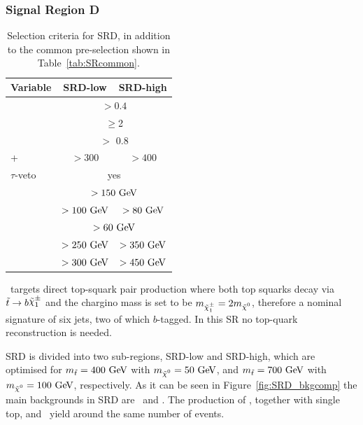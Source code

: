 			\subsubsection*{Signal Region D}

				\begin{table}
				  \caption{Selection criteria for SRD, in addition to the common pre-selection shown in Table~\ref{tab:SRcommon}.}
				  \begin{center}
				  \def\arraystretch{1.4}
				  \begin{tabular}{lcc}
				    \toprule
				    {\textbf{Variable}}       & {\textbf{SRD-low}} & {\textbf{SRD-high}} \\
				    \toprule
				    \dphijetthreemet     & \multicolumn{2}{c}{$>0.4$}     \\ %
				    \nBJet      & \multicolumn{2}{c}{$\geq$2}    \\%
				    \drbjetbjet     & \multicolumn{2}{c}{$>$ 0.8}    \\ %
				    \ptbzero+\ptbone & $>300$ \gev    & $>400$ \gev     \\ %
				    $\tau$-veto          & \multicolumn{2}{c}{yes}        \\ %
				    \ptone\              & \multicolumn{2}{c}{$>150\GeV$} \\ %
				    \ptthree\            & $>100\GeV$    & $>80\GeV$      \\ %
				    \ptfour\             & \multicolumn{2}{c}{$>60\GeV$}  \\ %
				    \mtbmin\             & $>250\GeV$    & $>350\GeV$     \\ %
				    \mtbmax\             & $>300\GeV$    & $>450\GeV$     \\ 
				    \bottomrule
				  \end{tabular}
				  \end{center}
				  \label{tab:SignalRegionD}
				\end{table}
				\SRD\ targets direct top-squark pair production where both top squarks decay via $\stop\to b \chinoonepm$ and the chargino mass is set to be $m_{\chinoonepm}=2\mLSP$, therefore a nominal signature of six jets, two of which $b$-tagged. In this \ac{SR} no top-quark reconstruction is needed. 

				SRD is divided into two sub-regions, SRD-low and SRD-high, which are optimised for $\mstop = 400\GeV$ with $\mLSP=50\GeV$, and $\mstop = 700\GeV$ with $\mLSP=100\GeV$, respectively. As it can be seen in Figure~\ref{fig:SRD_bkgcomp} the main backgrounds in SRD are \Zjets\ and \Wjets. The production of \ttbar, together with single top, and \ttV\ yield around the same number of events.

